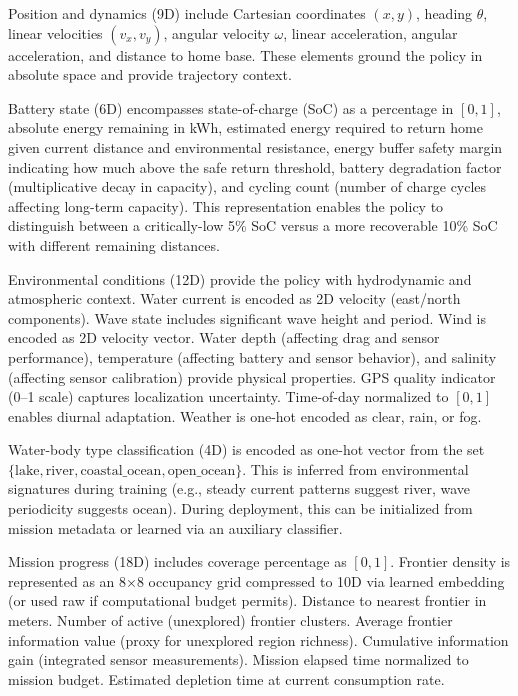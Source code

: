 Position and dynamics (9D) include Cartesian coordinates $(x, y)$, heading $\theta$, linear velocities $(v_x, v_y)$, angular velocity $\omega$, linear acceleration, angular acceleration, and distance to home base. These elements ground the policy in absolute space and provide trajectory context.

Battery state (6D) encompasses state-of-charge (SoC) as a percentage in $[0, 1]$, absolute energy remaining in kWh, estimated energy required to return home given current distance and environmental resistance, energy buffer safety margin indicating how much above the safe return threshold, battery degradation factor (multiplicative decay in capacity), and cycling count (number of charge cycles affecting long-term capacity). This representation enables the policy to distinguish between a critically-low 5\% SoC versus a more recoverable 10\% SoC with different remaining distances.

Environmental conditions (12D) provide the policy with hydrodynamic and atmospheric context. Water current is encoded as 2D velocity (east/north components). Wave state includes significant wave height and period. Wind is encoded as 2D velocity vector. Water depth (affecting drag and sensor performance), temperature (affecting battery and sensor behavior), and salinity (affecting sensor calibration) provide physical properties. GPS quality indicator (0--1 scale) captures localization uncertainty. Time-of-day normalized to $[0, 1]$ enables diurnal adaptation. Weather is one-hot encoded as clear, rain, or fog.

Water-body type classification (4D) is encoded as one-hot vector from the set $\{\text{lake}, \text{river}, \text{coastal\_ocean}, \text{open\_ocean}\}$. This is inferred from environmental signatures during training (e.g., steady current patterns suggest river, wave periodicity suggests ocean). During deployment, this can be initialized from mission metadata or learned via an auxiliary classifier.

Mission progress (18D) includes coverage percentage as $[0, 1]$. Frontier density is represented as an 8×8 occupancy grid compressed to 10D via learned embedding (or used raw if computational budget permits). Distance to nearest frontier in meters. Number of active (unexplored) frontier clusters. Average frontier information value (proxy for unexplored region richness). Cumulative information gain (integrated sensor measurements). Mission elapsed time normalized to mission budget. Estimated depletion time at current consumption rate.

